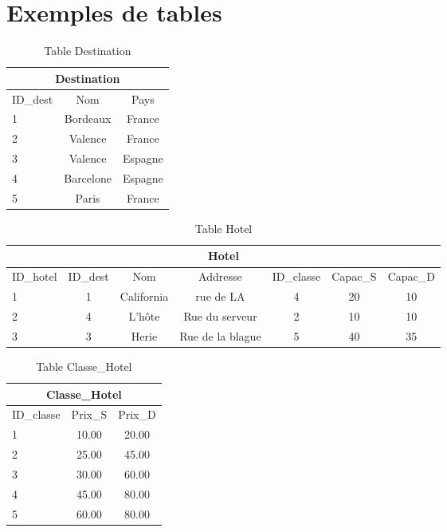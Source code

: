 \section{Exemples de tables}


\begin{table}[h]
\begin{center}
\begin{tabular}{|l|c|c|}
\hline
\multicolumn{3}{|c|}{Destination}\\
\hline
ID\_dest& Nom & Pays \\
\hline
1 & Bordeaux& France\\
\hline
2 & Valence& France\\
\hline
3 & Valence& Espagne\\
\hline
4 & Barcelone& Espagne\\
\hline
5 & Paris& France\\
\hline
\end{tabular}
\end{center}
\caption{Table Destination}
\end{table}


\begin{table}[h]
\begin{center}
\begin{tabular}{|l|c|c|c|c|c|c|}
\hline
\multicolumn{7}{|c|}{Hotel}\\
\hline
ID\_hotel& ID\_dest& Nom & Addresse &ID\_classe & Capac\_S & Capac\_D  \\
\hline
1 & 1& California&rue de LA& 4 & 20 & 10\\
\hline
2 & 4& L'hôte&Rue du serveur& 2 & 10 & 10\\
\hline
3 & 3& Herie&Rue de la blague& 5 & 40 & 35\\
\hline
\end{tabular}
\end{center}
\caption{Table Hotel}
\end{table}
\newpage


\begin{table}[h]
\begin{center}
\begin{tabular}{|l|c|c|}
\hline
\multicolumn{3}{|c|}{Classe\_Hotel}\\
\hline
ID\_classe& Prix\_S & Prix\_D \\
\hline
1 & 10.00& 20.00\\
\hline
2 & 25.00& 45.00\\
\hline
3 & 30.00& 60.00\\
\hline
4 &  45.00& 80.00\\
\hline
5 & 60.00& 80.00\\
\hline
\end{tabular}
\end{center}
\caption{Table Classe\_Hotel}
\end{table}

